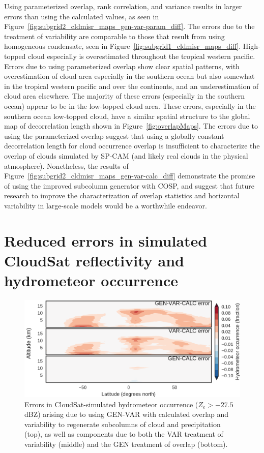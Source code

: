Using parameterized overlap, rank correlation, and variance results in
larger errors than using the calculated values, as seen in
Figure~\ref{fig:subgrid2_cldmisr_maps_gen-var-param_diff}. The errors
due to the treatment of variability are comparable to those that result
from using homogeneous condensate, seen in
Figure~\ref{fig:subgrid1_cldmisr_maps_diff}. High-topped cloud
especially is overestimated throughout the tropical western pacific.
Errors due to using parameterized overlap show clear spatial patterns,
with overestimation of cloud area especially in the southern ocean but
also somewhat in the tropical western pacific and over the continents,
and an underestimation of cloud area elsewhere. The majority of these
errors (especially in the southern ocean) appear to be in the low-topped
cloud area. These errors, especially in the southern ocean low-topped
cloud, have a similar spatial structure to the global map of
decorrelation length shown in Figure~\ref{fig:overlapMaps}. The errors
due to using the parameterized overlap suggest that using a globally
constant decorrelation length for cloud occurrence overlap is
insufficient to characterize the overlap of clouds simulated by SP-CAM
(and likely real clouds in the physical atmosphere). Nonetheless, the
results of Figure~\ref{fig:subgrid2_cldmisr_maps_gen-var-calc_diff}
demonstrate the promise of using the improved subcolumn generator with
COSP, and suggest that future research to improve the characterization
of overlap statistics and horizontal variability in large-scale models
would be a worthwhile endeavor.

\section{Reduced errors in simulated CloudSat reflectivity and
hydrometeor occurrence}\label{sec:subgrid2Active}

\begin{figure}[htbp]
\centering
\includegraphics{graphics/subgrid2_hfba_zonal_gen-var-calc_diff.pdf}
\caption{\label{fig:subgrid2_hfba_zonal_diff}Errors in
CloudSat-simulated hydrometeor occurrence (\(Z_e > -27.5\) dBZ) arising
due to using GEN-VAR with calculated overlap and variability to
regenerate subcolumns of cloud and precipitation (top), as well as
components due to both the VAR treatment of variability (middle) and the
GEN treatment of overlap
(bottom).}\label{fig:subgrid2ux5fhfbaux5fzonalux5fdiff}
\end{figure}

